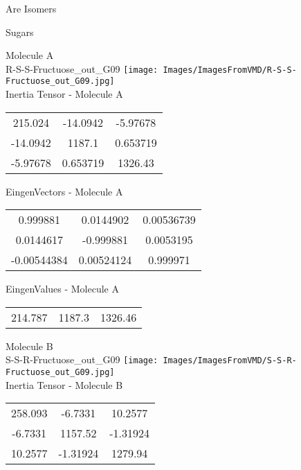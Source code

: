 \begin{center}
\vtab
\vtab
\textcolor{NavyBlue}{\Large Are Isomers}
\end{center}
\newpage

\vtab[-2cm]
\begin{center}
{\large Sugars}
\end{center}
\begin{multicols}{2}
\begin{center}
Molecule A \\ 
R-S-S-Fructuose\_out\_G09
\texttt{[image: Images/ImagesFromVMD/R-S-S-Fructuose\_out\_G09.jpg]}
\\
Inertia Tensor - Molecule A \\
\vtab
\begin{tabular}{|c c c|}
215.024	 & 	-14.0942	 & 	-5.97678	 \\
-14.0942	 & 	1187.1	 & 	0.653719	 \\
-5.97678	 & 	0.653719	 & 	1326.43
\end{tabular}

\vtab
 EingenVectors - Molecule A     \\
\vtab
\begin{tabular}{|c c c|}
0.999881	 & 	0.0144902	 & 	0.00536739	 \\
0.0144617	 & 	-0.999881	 & 	0.0053195	 \\
-0.00544384	 & 	0.00524124	 & 	0.999971
\end{tabular}

\vtab
 EingenValues - Molecule A     \\
\vtab
\begin{tabular}{|c c c|}
214.787	 & 	1187.3	 & 	1326.46
\end{tabular}
\columnbreak

Molecule B \\ 
S-S-R-Fructuose\_out\_G09
\texttt{[image: Images/ImagesFromVMD/S-S-R-Fructuose\_out\_G09.jpg]}
\\
Inertia Tensor - Molecule B \\
\vtab
\begin{tabular}{|c c c|}
258.093	 & 	-6.7331	 & 	10.2577	 \\
-6.7331	 & 	1157.52	 & 	-1.31924	 \\
10.2577	 & 	-1.31924	 & 	1279.94
\end{tabular}


\end{center}
\end{multicols}
